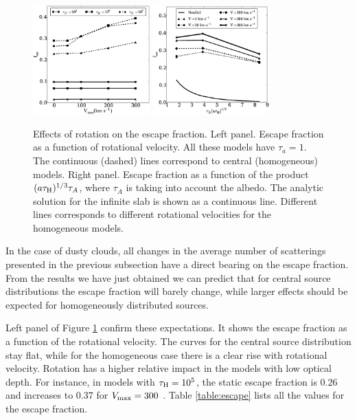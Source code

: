 \documentclass{emulateapj}
\newcommand{\kms}{{\ifmmode{{\mathrm{\,km\ s}^{-1}}}\else{\,km~s$^{-1}$}\fi}}
\begin{document}
\begin{figure}
\begin{center}
  \includegraphics[width=0.40\textwidth]{f6.eps}
  \includegraphics[width=0.40\textwidth]{f7.eps}
\end{center}
  \caption{Effects of rotation on the escape fraction. Left
    panel. Escape fraction as a function of rotational velocity. All
    these models have $\tau_{a}=1$. The continuous (dashed) lines
    correspond to central (homogeneous) models. Right panel. Escape
    fraction as a    function of the product $(a\tau_{\rm
      H})^{1/3}\tau_{A}$, where $\tau_{A}$ is taking into account the albedo. The    analytic solution for the infinite
    slab is shown as a continuous    line. Different lines corresponds
    to different rotational velocities for the homogeneous models.     \label{fig:efvsv}} 
\end{figure}

In the case of dusty clouds, all changes in the average number
of scatterings presented in the previous subsection have a direct
bearing on the escape fraction. From the results we have just obtained
we can predict that for central source distributions the escape
fraction will barely change, while larger effects should be expected
for homogeneously distributed sources. 

Left panel of Figure \ref{fig:efvsv} confirm these expectations. It shows the escape
fraction as a function of the rotational velocity. The curves for the
central source distribution stay flat, while for the homogeneous case
there is a clear rise with rotational velocity.  Rotation has a higher relative impact in
the models with low optical depth. For instance, in models with
$\tau_{\rm H}=10^5$, the static escape fraction is $0.26$ and increases
to $0.37$ for $V_{\rm max}=300$ \kms. Table \ref{table:escape} lists
all the values for the escape fraction. 
\end{document}
